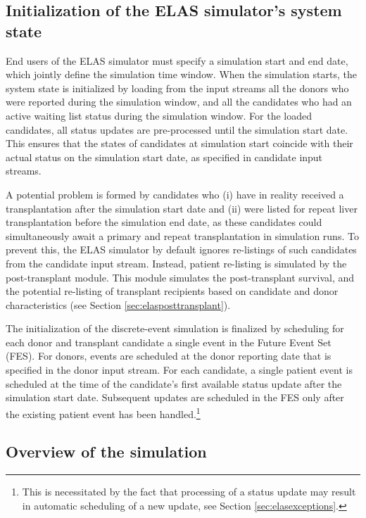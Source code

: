 \documentclass[11pt,twoside,]{book}
\let\rmarkdownfootnote\footnote%
\def\footnote{\protect\rmarkdownfootnote}
\begin{document}
\vfill

\subsection{Initialization of the ELAS simulator's system state}\label{sec:elasinit}

End users of the ELAS simulator must specify a simulation start and end
date, which jointly define the simulation time window. When the simulation
starts, the system state is initialized by loading from the input streams
all the donors who were reported during the simulation window, and all the
candidates who had an active waiting list status during the simulation window. For the
loaded candidates, all status updates are pre-processed until the
simulation start date. This ensures that the states of candidates at simulation start coincide with their actual status on the simulation start date, as
specified in candidate input streams.

A potential problem is formed by candidates who (i) have in reality received a
transplantation after the simulation start date and (ii) were listed for
repeat liver transplantation before the simulation end date, as these candidates
could simultaneously await a primary and repeat transplantation in simulation runs.
To prevent this, the ELAS simulator by default ignores re-listings
of such candidates from the candidate input stream. Instead, patient re-listing
is simulated by the post-transplant module. This module simulates the post-transplant survival,
and the potential re-listing of transplant recipients based on
candidate and donor characteristics (see Section \ref{sec:elasposttransplant}).

The initialization of the discrete-event simulation is finalized by
scheduling for each donor and transplant candidate a single event
in the Future Event Set (FES). For donors, events are scheduled at the
donor reporting date that is specified in the donor input stream. For each
candidate, a single patient event is scheduled at the time of the
candidate's first available status update after the simulation start
date. Subsequent updates are scheduled in the FES only after the
existing patient event has been handled.\footnote{This is necessitated by the
  fact that processing of a status update may result in automatic scheduling
  of a new update, see Section \ref{sec:elasexceptions}.}

\subsection{Overview of the simulation}\label{sec:elasoverview}
\end{document}
